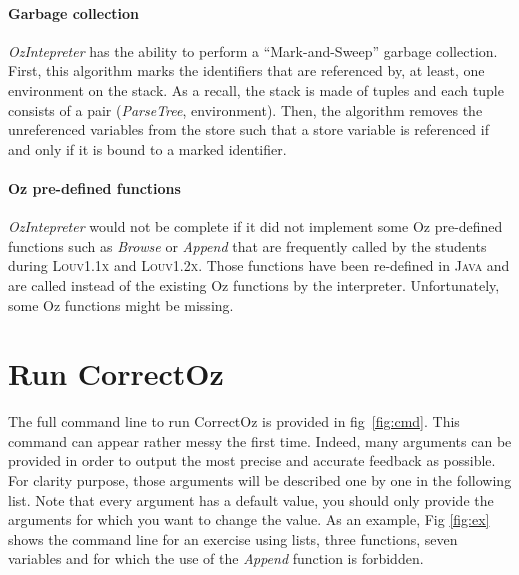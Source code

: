 \documentclass[11pt,a4paper,twoside,openright]{report}
\begin{document}
\paragraph{Garbage collection}
\textit{OzIntepreter} has the ability to perform a \enquote{Mark-and-Sweep} 
garbage collection. First, this algorithm marks the identifiers that are 
referenced by, at least, one environment on the stack. As a recall, the stack is 
made of tuples and each tuple consists of a pair (\textit{ParseTree}, 
environment). Then, the algorithm removes the unreferenced variables from the 
store such that a store variable is referenced if and only if it is bound to a 
marked identifier.

\paragraph{Oz pre-defined functions}
\textit{OzIntepreter} would not be complete if it did not implement some Oz 
pre-defined functions such as \textit{Browse} or \textit{Append} that are 
frequently called by the students during \textsc{Louv1.1x} and 
\textsc{Louv1.2x}. Those functions have been re-defined in \textsc{Java} and 
are called instead of the existing Oz functions by the interpreter. 
Unfortunately, some Oz functions might be missing. 


\section{Run CorrectOz}

The full command line to run CorrectOz is provided in fig~\ref{fig:cmd}. This 
command can appear rather messy the first time. Indeed, many arguments can be 
provided in order to output the most precise and accurate feedback as possible. 
For clarity purpose, those arguments will be described one by one in the 
following list. Note that every argument has a default value, you should only
provide the arguments for which you want to change the value. As an example,
Fig \ref{fig:ex} shows the command line for an exercise using lists, three functions,
seven variables and for which the use of the \textit{Append} function is forbidden.
\end{document}
